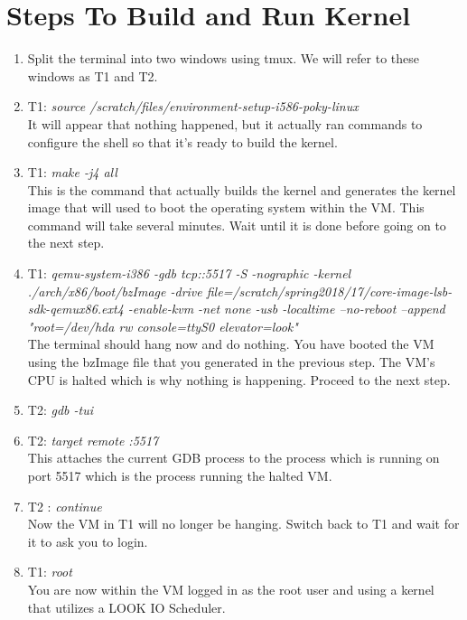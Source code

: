 \documentclass[onecolumn,draftclsnofoot, 10pt, compsoc]{IEEEtran}
\begin{document}
\section{Steps To Build and Run Kernel}
	\begin{enumerate}
		\item
			Split the terminal into two windows using tmux.
			We will refer to these windows as T1 and T2. 
		\item
			T1: \textit{source /scratch/files/environment-setup-i586-poky-linux} \\
			It will appear that nothing happened, but it actually ran commands to configure the shell so that it’s ready to build the kernel. 
		\item
			T1: \textit{make -j4 all} \\
			This is the command that actually builds the kernel and generates the kernel image that will used to boot the operating system within the VM. 
			This command will take several minutes. 
			Wait until it is done before going on to the next step.
		\item
			T1: 
			\textit{qemu-system-i386 -gdb tcp::5517 -S -nographic -kernel ./arch/x86/boot/bzImage -drive file=/scratch/spring2018/17/core-image-lsb-sdk-qemux86.ext4 -enable-kvm -net none -usb -localtime --no-reboot --append "root=/dev/hda rw console=ttyS0 elevator=look"} \\
			The terminal should hang now and do nothing. 
			You have booted the VM using the bzImage file that you generated in the previous step. 
			The VM’s CPU is halted which is why nothing is happening. 
			Proceed to the next step.	
		\item
			T2: \textit{gdb -tui}
		\item
			T2: \textit{target remote :5517} \\
			This attaches the current GDB process to the process which is running on port 5517 which is the process running the halted VM.
		\item
			T2 : \textit{continue} \\
			Now the VM in T1 will no longer be hanging. 
			Switch back to T1 and wait for it to ask you to login.
		\item
			T1: \textit{root} \\
			You are now within the VM logged in as the root user and using a kernel that utilizes a LOOK IO Scheduler. 
	\end{enumerate}
\end{document}
